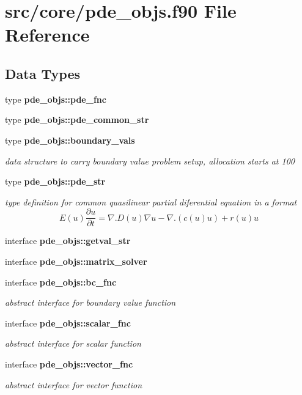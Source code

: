 \section{src/core/pde\+\_\+objs.f90 File Reference}
\label{pde__objs_8f90}
\subsection*{Data Types}
\begin{DoxyCompactItemize}
\item 
type {\bf pde\+\_\+objs\+::pde\+\_\+fnc}
\item 
type {\bf pde\+\_\+objs\+::pde\+\_\+common\+\_\+str}
\item 
type {\bf pde\+\_\+objs\+::boundary\+\_\+vals}
\begin{DoxyCompactList}\small\item\em data structure to carry boundary value problem setup, allocation starts at 100 \end{DoxyCompactList}\item 
type {\bf pde\+\_\+objs\+::pde\+\_\+str}
\begin{DoxyCompactList}\small\item\em type definition for common quasilinear partial diferential equation in a format \[ E(u)\frac{\partial u}{\partial t} = \nabla . D(u) \nabla u - \nabla . (c(u) u) + r(u) u \] \end{DoxyCompactList}\item 
interface {\bf pde\+\_\+objs\+::getval\+\_\+str}
\item 
interface {\bf pde\+\_\+objs\+::matrix\+\_\+solver}
\item 
interface {\bf pde\+\_\+objs\+::bc\+\_\+fnc}
\begin{DoxyCompactList}\small\item\em abstract interface for boundary value function \end{DoxyCompactList}\item 
interface {\bf pde\+\_\+objs\+::scalar\+\_\+fnc}
\begin{DoxyCompactList}\small\item\em abstract interface for scalar function \end{DoxyCompactList}\item 
interface {\bf pde\+\_\+objs\+::vector\+\_\+fnc}
\begin{DoxyCompactList}\small\item\em abstract interface for vector function \end{DoxyCompactList}\item 

\end{DoxyCompactItemize}
